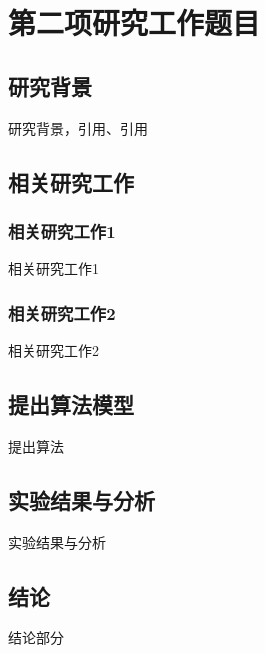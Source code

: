 \section{第二项研究工作题目}

\subsection{研究背景}
研究背景，引用\cite{FasterRCNN}、引用\cite{MAE}


\subsection{相关研究工作}

\subsubsection{相关研究工作1}
相关研究工作1


\subsubsection{相关研究工作2}
相关研究工作2


\subsection{提出算法模型}
提出算法

\subsection{实验结果与分析}
实验结果与分析

\subsection{结论}
结论部分
